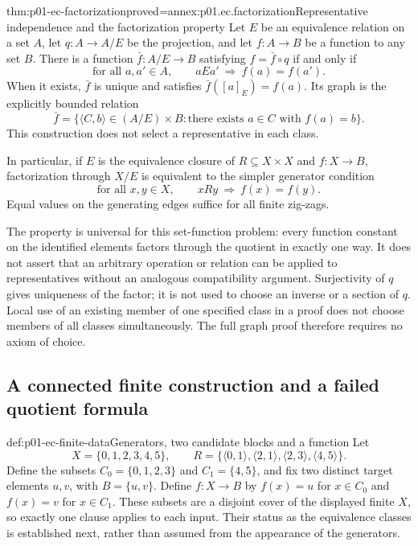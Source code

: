 \begin{hbtheorem}{thm:p01-ec-factorization}{proved=annex:p01.ec.factorization}{Representative independence and the factorization property}
Let \(E\) be an equivalence relation on a set \(A\), let
\(q:A\to A/E\) be the projection, and let \(f:A\to B\) be a
function to any set \(B\). There is a function \(\bar f:A/E\to B\)
satisfying \(f=\bar f\circ q\) if and only if
\[
 \text{for all }a,a'\in A,\qquad aEa'\ \Longrightarrow\ f(a)=f(a').
\]
When it exists, \(\bar f\) is unique and satisfies
\(\bar f([a]_E)=f(a)\). Its graph is the explicitly bounded relation
\[
 \bar f=\{\langle C,b\rangle\in(A/E)\times B:
                \text{there exists }a\in C\text{ with }f(a)=b\}.
\]
This construction does not select a representative in each class.

In particular, if \(E\) is the equivalence closure of
\(R\subseteq X\times X\) and \(f:X\to B\), factorization through
\(X/E\) is equivalent to the simpler generator condition
\[
 \text{for all }x,y\in X,\qquad xRy\ \Longrightarrow\ f(x)=f(y).
\]
Equal values on the generating edges suffice for all finite zig-zags.
\end{hbtheorem}

The property is universal for this set-function problem: every
function constant on the identified elements factors through the quotient
in exactly one way. It does not assert that an arbitrary operation or
relation can be applied to representatives without an analogous compatibility
argument. Surjectivity of \(q\) gives uniqueness of the factor; it is not
used to choose an inverse or a section of \(q\). Local use of an existing
member of one specified class in a proof does not choose members of all
classes simultaneously. The full graph proof therefore requires no axiom
of choice.

\subsection{A connected finite construction and a failed quotient formula}

\begin{hbexample}{def:p01-ec-finite-data}{Generators, two candidate blocks and a function}
Let
\[
 X=\{0,1,2,3,4,5\},\qquad
 R=\{\langle0,1\rangle,\langle2,1\rangle,
      \langle2,3\rangle,\langle4,5\rangle\}.
\]
Define the subsets \(C_0=\{0,1,2,3\}\) and \(C_1=\{4,5\}\),
and fix two distinct target elements \(u,v\), with \(B=\{u,v\}\).
Define \(f:X\to B\) by \(f(x)=u\) for \(x\in C_0\) and
\(f(x)=v\) for \(x\in C_1\). These subsets are a disjoint cover
of the displayed finite \(X\), so exactly one clause applies to each
input. Their status as the equivalence classes is established next, rather
than assumed from the appearance of the generators.
\end{hbexample}

